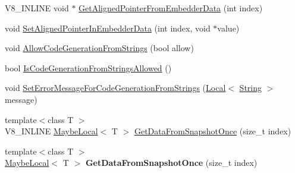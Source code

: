 \begin{DoxyCompactItemize}
\item 
V8\+\_\+\+I\+N\+L\+I\+NE void $\ast$ \mbox{\hyperlink{classv8_1_1Context_aa3b5c1a1a5d145c6096840898013f559}{Get\+Aligned\+Pointer\+From\+Embedder\+Data}} (int index)
\item 
void \mbox{\hyperlink{classv8_1_1Context_a522063c88e4c2832f5ff4f3980815f58}{Set\+Aligned\+Pointer\+In\+Embedder\+Data}} (int index, void $\ast$value)
\item 
void \mbox{\hyperlink{classv8_1_1Context_a794ccc42113566f5d363f89c8b0d3c2c}{Allow\+Code\+Generation\+From\+Strings}} (bool allow)
\item 
bool \mbox{\hyperlink{classv8_1_1Context_aa7a960a232d232d1a2a904c2e6c18831}{Is\+Code\+Generation\+From\+Strings\+Allowed}} ()
\item 
void \mbox{\hyperlink{classv8_1_1Context_a8c919ccddb6fbb65602f7fe2587e8a34}{Set\+Error\+Message\+For\+Code\+Generation\+From\+Strings}} (\mbox{\hyperlink{classv8_1_1Local}{Local}}$<$ \mbox{\hyperlink{classv8_1_1String}{String}} $>$ message)
\item 
{\footnotesize template$<$class T $>$ }\\V8\+\_\+\+I\+N\+L\+I\+NE \mbox{\hyperlink{classv8_1_1MaybeLocal}{Maybe\+Local}}$<$ T $>$ \mbox{\hyperlink{classv8_1_1Context_a8bf1137318f67dfdc9444a72aa2cda4a}{Get\+Data\+From\+Snapshot\+Once}} (size\+\_\+t index)
\item 
\mbox{\label{classv8_1_1Context_a04bb5d7aca2ef63a5a41257d75b8f276}} 
{\footnotesize template$<$class T $>$ }\\\mbox{\hyperlink{classv8_1_1MaybeLocal}{Maybe\+Local}}$<$ T $>$ {\bfseries Get\+Data\+From\+Snapshot\+Once} (size\+\_\+t index)
\end{DoxyCompactItemize}
